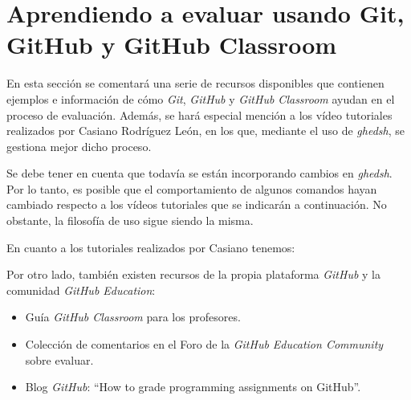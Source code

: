 \section{Aprendiendo a evaluar usando Git, GitHub y GitHub Classroom}
\label{3:sec:6}

En esta sección se comentará una serie de recursos disponibles que contienen ejemplos e información de cómo {\it Git}, {\it GitHub} y {\it GitHub Classroom} ayudan en el proceso de evaluación.
Además, se hará especial mención a los vídeo tutoriales realizados por Casiano Rodríguez León, en los que, mediante el uso de {\it ghedsh}, se gestiona mejor dicho proceso.
\bigskip

Se debe tener en cuenta que todavía se están incorporando cambios en {\it ghedsh}. Por lo tanto, es posible que el comportamiento de algunos comandos hayan cambiado respecto a los vídeos tutoriales que se indicarán a continuación. No obstante,
la filosofía de uso sigue siendo la misma.
\bigskip

En cuanto a los tutoriales realizados por Casiano tenemos:
\bigskip

Por otro lado, también existen recursos de la propia plataforma {\it GitHub} y la comunidad {\it GitHub Education}:
\begin{itemize}
	\item Guía {\it GitHub Classroom} para los profesores\cite{B33}.
	\item Colección de comentarios en el Foro de la {\it GitHub Education Community} sobre evaluar\cite{B34}.
	\item Blog {\it GitHub}: ``How to grade programming assignments on GitHub''\cite{B35}.
\end{itemize}